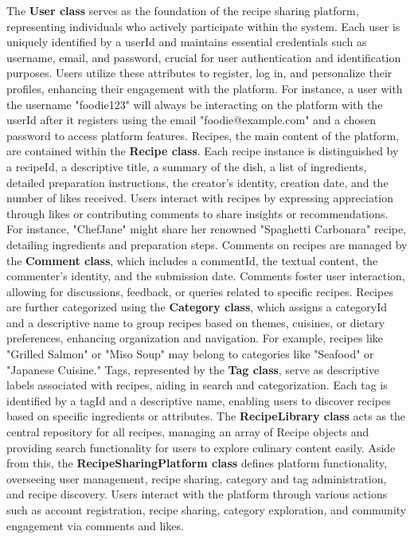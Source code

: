 The \textbf{User class} serves as the foundation of the recipe sharing platform, representing individuals who actively participate within the system. Each user is uniquely identified by a userId and maintains essential credentials such as username, email, and password, crucial for user authentication and identification purposes. Users utilize these attributes to register, log in, and personalize their profiles, enhancing their engagement with the platform. For instance, a user with the username "foodie123" will always be interacting on the platform with the userId after it registers using the email "foodie@example.com" and a chosen password to access platform features. Recipes, the main content of the platform, are contained within the \textbf{Recipe class}. Each recipe instance is distinguished by a recipeId, a descriptive title, a summary of the dish, a list of ingredients, detailed preparation instructions, the creator's identity, creation date, and the number of likes received. Users interact with recipes by expressing appreciation through likes or contributing comments to share insights or recommendations. For instance, "ChefJane" might share her renowned "Spaghetti Carbonara" recipe, detailing ingredients and preparation steps.
Comments on recipes are managed by the \textbf{Comment class}, which includes a commentId, the textual content, the commenter's identity, and the submission date. Comments foster user interaction, allowing for discussions, feedback, or queries related to specific recipes.
Recipes are further categorized using the \textbf{Category class}, which assigns a categoryId and a descriptive name to group recipes based on themes, cuisines, or dietary preferences, enhancing organization and navigation. For example, recipes like "Grilled Salmon" or "Miso Soup" may belong to categories like "Seafood" or "Japanese Cuisine."
Tags, represented by the \textbf{Tag class}, serve as descriptive labels associated with recipes, aiding in search and categorization. Each tag is identified by a tagId and a descriptive name, enabling users to discover recipes based on specific ingredients or attributes.
The \textbf{RecipeLibrary class} acts as the central repository for all recipes, managing an array of Recipe objects and providing search functionality for users to explore culinary content easily. Aside from this, the \textbf{RecipeSharingPlatform class} defines platform functionality, overseeing user management, recipe sharing, category and tag administration, and recipe discovery. Users interact with the platform through various actions such as account registration, recipe sharing, category exploration, and community engagement via comments and likes.

